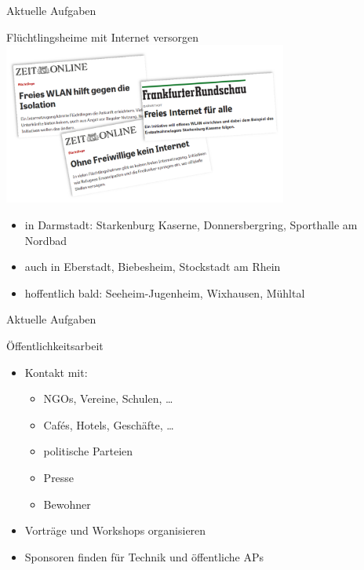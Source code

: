 \documentclass[handout, 10pt]{beamer}
\begin{document}
\begin{frame}{Aktuelle Aufgaben}
	\begin{center}
		\large Flüchtlingsheime mit Internet versorgen \\
		\includegraphics[width=0.7\textwidth]{images/2015-10_presse-fluechtlinge}
	\end{center}
	\begin{itemize}[<+->]
		\item in Darmstadt: Starkenburg Kaserne, Donnersbergring, Sporthalle am Nordbad
		\item auch in Eberstadt, Biebesheim, Stockstadt am Rhein
		\item hoffentlich bald: Seeheim-Jugenheim, Wixhausen, Mühltal
	\end{itemize}	
\end{frame}	

\begin{frame}{Aktuelle Aufgaben}
	\begin{center}
		\large Öffentlichkeitsarbeit
		\vfill
	\end{center}
	\begin{itemize}[<+->]
		\item Kontakt mit:
		\begin{itemize}[<+->]
			\item NGOs, Vereine, Schulen, \ldots
			\item Cafés, Hotels, Geschäfte, \ldots
			\item politische Parteien
			\item Presse
			\item Bewohner
		\end{itemize}	
		\item Vorträge und Workshops organisieren
		\item Sponsoren finden für Technik und öffentliche APs
	\end{itemize}
\end{frame}
\end{document}

